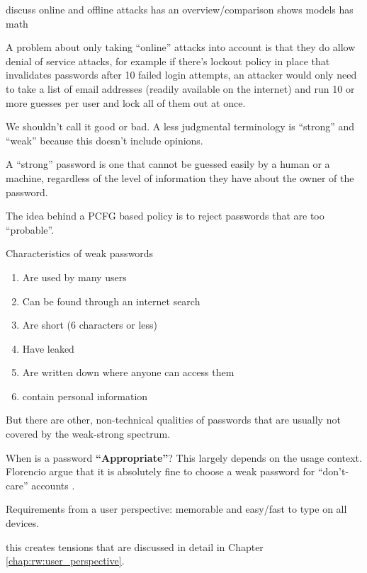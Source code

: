 discuss online and offline attacks
\cite{Wang2016fuzzyPWM} has an overview/comparison
\cite{Florencio2014AdministratorsGuide} shows models
\cite{Florencio2014PasswordPortfoliosFiniteUser} has math

A problem about only taking ``online'' attacks into account is that they do allow denial of service attacks, for example if there's lockout policy in place that invalidates passwords after 10 failed login attempts, an attacker would only need to take a list of email addresses (readily available on the internet) and run 10 or more guesses per user and lock all of them out at once. 

We shouldn't call it good or bad. A less judgmental terminology is ``strong'' and ``weak'' because this doesn't include opinions. 

A ``strong'' password is one that cannot be guessed easily by a human or a machine, regardless of the level of information they have about the owner of the password. 

The idea behind a PCFG based policy is to reject passwords that are too ``probable''. 

Characteristics of weak passwords \cite{Burnett2005PerfectPasswords}
\begin{enumerate}
	\item Are used by many users
	\item Can be found through an internet search
	\item Are short (6 characters or less)
	\item Have leaked
	\item Are written down where anyone can access them
	\item contain personal information \cite{Li2017PersonalInformation}
\end{enumerate}

But there are other, non-technical qualities of passwords that are usually not covered by the weak-strong spectrum. 

When is a password \textbf{``Appropriate''}? This largely depends on the usage context. \cite{Gaw2005ReuseRecycle, Haque2014Hierarchy}
Florencio \etal argue that it is absolutely fine to choose a weak password for ``don't-care'' accounts \cite{Florencio2014}.

Requirements from a user perspective: memorable and easy/fast to type on all devices.

this creates tensions that are discussed in detail in Chapter \ref{chap:rw:user_perspective}.


